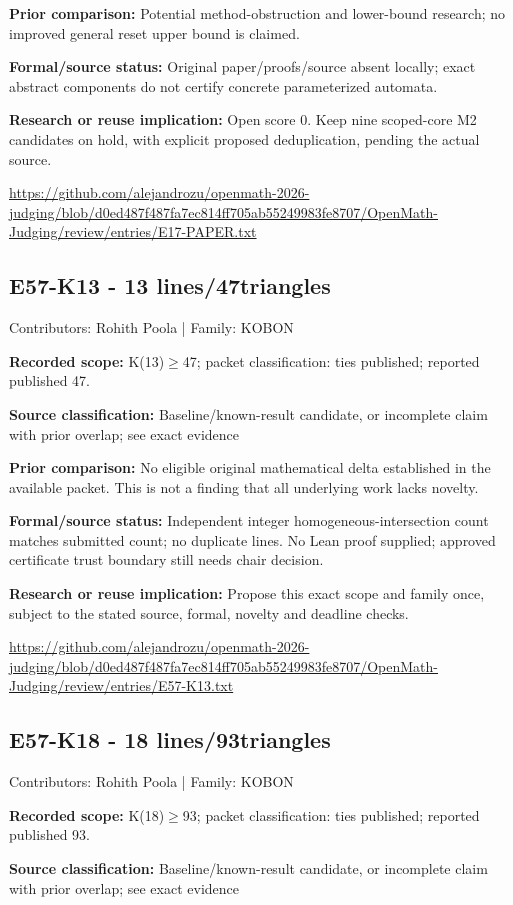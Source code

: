 \documentclass[11pt,a4paper]{article}
\begin{document}
\textbf{Prior comparison:} Potential method-obstruction and lower-bound research; no improved general reset upper bound is claimed.

\textbf{Formal/source status:} Original paper/proofs/source absent locally; exact abstract components do not certify concrete parameterized automata.

\textbf{Research or reuse implication:} Open score 0. Keep nine scoped-core M2 candidates on hold, with explicit proposed deduplication, pending the actual source.

{\small \url{https://github.com/alejandrozu/openmath-2026-judging/blob/d0ed487f487fa7ec814ff705ab55249983fe8707/OpenMath-Judging/review/entries/E17-PAPER.txt}\par}

\begin{samepage}
\subsection{E57-K13  -  13 lines/47triangles}
{\small Contributors: Rohith Poola | Family: KOBON\par}

\textbf{Recorded scope:} K(13)\ensuremath{\geq}47; packet classification: ties published; reported published 47.

\end{samepage}
\textbf{Source classification:} Baseline/known-result candidate, or incomplete claim with prior overlap; see exact evidence

\textbf{Prior comparison:} No eligible original mathematical delta established in the available packet. This is not a finding that all underlying work lacks novelty.

\textbf{Formal/source status:} Independent integer homogeneous-intersection count matches submitted count; no duplicate lines. No Lean proof supplied; approved certificate trust boundary still needs chair decision.

\textbf{Research or reuse implication:} Propose this exact scope and family once, subject to the stated source, formal, novelty and deadline checks.

{\small \url{https://github.com/alejandrozu/openmath-2026-judging/blob/d0ed487f487fa7ec814ff705ab55249983fe8707/OpenMath-Judging/review/entries/E57-K13.txt}\par}

\begin{samepage}
\subsection{E57-K18  -  18 lines/93triangles}
{\small Contributors: Rohith Poola | Family: KOBON\par}

\textbf{Recorded scope:} K(18)\ensuremath{\geq}93; packet classification: ties published; reported published 93.

\end{samepage}
\textbf{Source classification:} Baseline/known-result candidate, or incomplete claim with prior overlap; see exact evidence
\end{document}
